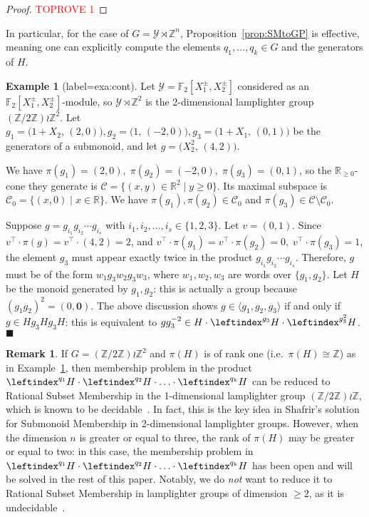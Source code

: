\documentclass[a4paper,UKenglish,cleveref, autoref, thm-restate]{lipics-v2021}
\newcommand{\Z}{\mathbb{Z}}
\newcommand{\R}{\mathbb{R}}
\newcommand{\F}{\mathbb{F}}
\newcommand{\mC}{\mathcal{C}}
\newcommand{\mY}{\mathcal{Y}}
\newcommand{\bzer}{\boldsymbol{0}}
\newcommand{\gen}[1]{\langle {#1} \rangle}
\theoremstyle{definition}
\theoremstyle{definition}
\newtheorem{exmpl}[thrm]{Example}
\theoremstyle{definition}
\newtheorem{rmk}[thrm]{Remark}
\begin{document}
\begin{proof}\textcolor{red}{TOPROVE 1}\end{proof}

In particular, for the case of $G =  \mY \rtimes \Z^n$, Proposition~\ref{prop:SMtoGP} is effective, meaning one can explicitly compute the elements $q_1, \ldots, q_k \in G$ and the generators of $H$.

\begin{exmpl}[label=exa:cont]\label{expl:running}
Let $\mY = \F_2[X_1^{\pm}, X_2^{\pm}]$ considered as an $\F_2[X_1^{\pm}, X_2^{\pm}]$-module, so $\mY \rtimes \Z^2$ is the 2-dimensional lamplighter group $(\Z/2\Z) \wr \Z^2$.
Let $g_1 = \big(1 + X_2, \, (2, 0)\big), g_2 = \big(1, \, (- 2, 0)\big), g_3 = \big(1 + X_1, \, (0, 1)\big)$ be the generators of a submonoid, and let $g = \big(X_2^2, \, (4, 2)\big)$.

We have $\pi(g_1) = (2, 0), \; \pi(g_2) = (-2, 0), \; \pi(g_3) = (0, 1)$, so the $\R_{\geq 0}$-cone they generate is $\mC = \{(x, y) \in \R^2 \mid y \geq 0\}$.
Its maximal subspace is $\mC_0 = \{(x, 0) \mid x \in \R\}$.
We have $\pi(g_1), \pi(g_2) \in \mC_0$ and $\pi(g_3) \in \mC \setminus \mC_0$.

Suppose $g = g_{i_1} g_{i_2} \cdots g_{i_s}$ with $i_1, i_2, \ldots, i_s \in \{1, 2, 3\}$.
Let $v = (0, 1)$.
Since $v^{\top} \cdot \pi(g) = v^{\top} \cdot (4, 2) = 2$, and $v^{\top} \cdot \pi(g_1) = v^{\top} \cdot \pi(g_2) = 0, \; v^{\top} \cdot \pi(g_3) = 1$, the element $g_3$ must appear exactly twice in the product $g_{i_1} g_{i_2} \cdots g_{i_s}$.
Therefore, $g$ must be of the form $w_1 g_3 w_2 g_3 w_3$, where $w_1, w_2, w_3$ are words over $\{g_1, g_2\}$.
Let $H$ be the monoid generated by $g_1, g_2$: this is actually a group because $(g_1 g_2)^2 = (0, \bzer)$.
The above discussion shows $g \in \gen{g_1, g_2, g_3}$ if and only if $g \in H g_3 H g_3 H$: this is equivalent to $g g_3^{-2} \in H \cdot \leftindex^{g_3}{H} \cdot \leftindex^{g_3^{2}}{H}$.
\hfill $\blacksquare$
\end{exmpl}

\begin{rmk}
If $G = (\Z/2\Z) \wr \Z^2$ and $\pi(H)$ is of rank one (i.e.\ $\pi(H) \cong \Z$) as in Example~\ref{expl:running}, then membership problem in the product $\leftindex^{q_1}{H} \cdot \leftindex^{q_2}{H} \cdot \ldots \cdot \leftindex^{q_{k}}{H}$ can be reduced to Rational Subset Membership in the 1-dimensional lamplighter group $(\Z/2\Z) \wr \Z$, which is known to be decidable~\cite{lohrey2015rational}. In fact, this is the key idea in Shafrir's solution~\cite{potthast2020submonoid} for Submonoid Membership in 2-dimensional lamplighter groups.
However, when the dimension $n$ is greater or equal to three, the rank of $\pi(H)$ may be greater or equal to two: in this case, the membership problem in $\leftindex^{q_1}{H} \cdot \leftindex^{q_2}{H} \cdot \ldots \cdot \leftindex^{q_{k}}{H}$ has been open and will be solved in the rest of this paper.
Notably, we do \emph{not} want to reduce it to Rational Subset Membership in lamplighter groups of dimension $\geq 2$, as it is undecidable~\cite{lohrey2011tilings}.
\end{rmk}
\end{document}

